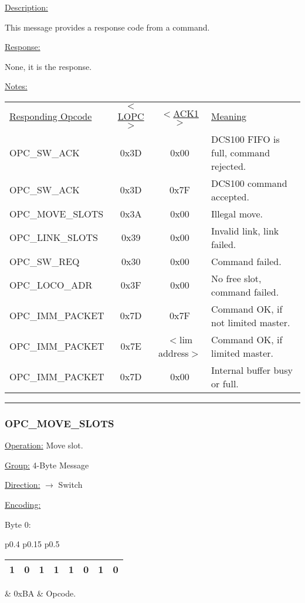 \underline{Description:}

This message provides a response code from a command.

\underline{Response:} 

None, it is the response.

\underline{Notes:} 

\begin{tabular}{l c c l}
\underline{Responding Opcode} & \underline{$<$LOPC$>$} & \underline{$<$ACK1$>$} & \underline{Meaning}\\
OPC\_SW\_ACK & 0x3D & 0x00 & DCS100 FIFO is full, command rejected.\\
OPC\_SW\_ACK & 0x3D & 0x7F &  DCS100 command accepted.\\
OPC\_MOVE\_SLOTS & 0x3A & 0x00 & Illegal move.\\
OPC\_LINK\_SLOTS & 0x39 & 0x00 & Invalid link, link failed.\\
OPC\_SW\_REQ & 0x30 & 0x00 & Command failed.\\
OPC\_LOCO\_ADR & 0x3F & 0x00 & No free slot, command failed.\\
OPC\_IMM\_PACKET & 0x7D & 0x7F & Command OK, if not limited master.\\
OPC\_IMM\_PACKET & 0x7E & $<$lim address$>$ & Command OK, if limited master.\\
OPC\_IMM\_PACKET & 0x7D & 0x00 & Internal buffer busy or full.\\
\end{tabular}

\rule{15.1cm}{0.4pt}
\subsubsection{OPC\_MOVE\_SLOTS}
\underline{Operation:} Move slot.

\underline{Group:} \hspace{0.5cm} 4-Byte Message

\underline{Direction:} \hspace{0.05cm} $\rightarrow$ Switch

\underline{Encoding:} 

Byte 0:

\begin{tabular}{p{0.4\linewidth} p{0.15\linewidth} p{0.5\linewidth}} 

\begin{tabular}{|p{0.3cm}|p{0.3cm}|p{0.3cm}|p{0.3cm}|p{0.3cm}|p{0.3cm}|p{0.3cm}|p{0.3cm}|}
\hline
1 & 0 & 1 & 1 & 1 & 0 & 1 & 0\\
\hline
\end{tabular}
& 0xBA & Opcode.\\
\end{tabular}

